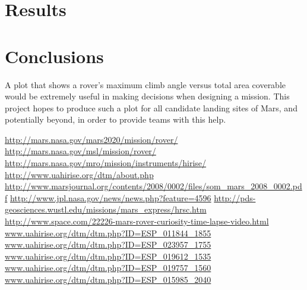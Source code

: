 \documentclass[12pt]{article}
\begin{document}
\section{Results}
\label{sec:results}


\section{Conclusions}
\label{sec:conclusions}
A plot that shows a rover's maximum climb angle versus total area coverable would be extremely useful in making decisions when designing a mission. This project hopes to produce such a plot for all candidate landing sites of Mars, and potentially beyond, in order to provide teams with this help.

\begin{thebibliography}{30}
  \url{http://mars.nasa.gov/mars2020/mission/rover/}
  \url{http://mars.nasa.gov/msl/mission/rover/}
  \url{http://mars.nasa.gov/mro/mission/instruments/hirise/}
  \url{http://www.uahirise.org/dtm/about.php}
  \url{http://www.marsjournal.org/contents/2008/0002/files/som_mars_2008_0002.pdf}
  \url{http://www.jpl.nasa.gov/news/news.php?feature=4596}
  \url{http://pds-geosciences.wustl.edu/missions/mars_express/hrsc.htm}
  \url{http://www.space.com/22226-mars-rover-curiosity-time-lapse-video.html}
  \url{www.uahirise.org/dtm/dtm.php?ID=ESP_011844_1855}
  \url{www.uahirise.org/dtm/dtm.php?ID=ESP_023957_1755}
  \url{www.uahirise.org/dtm/dtm.php?ID=ESP_019612_1535}
  \url{www.uahirise.org/dtm/dtm.php?ID=ESP_019757_1560}
  \url{www.uahirise.org/dtm/dtm.php?ID=ESP_015985_2040}
\end{thebibliography}
\end{document}
